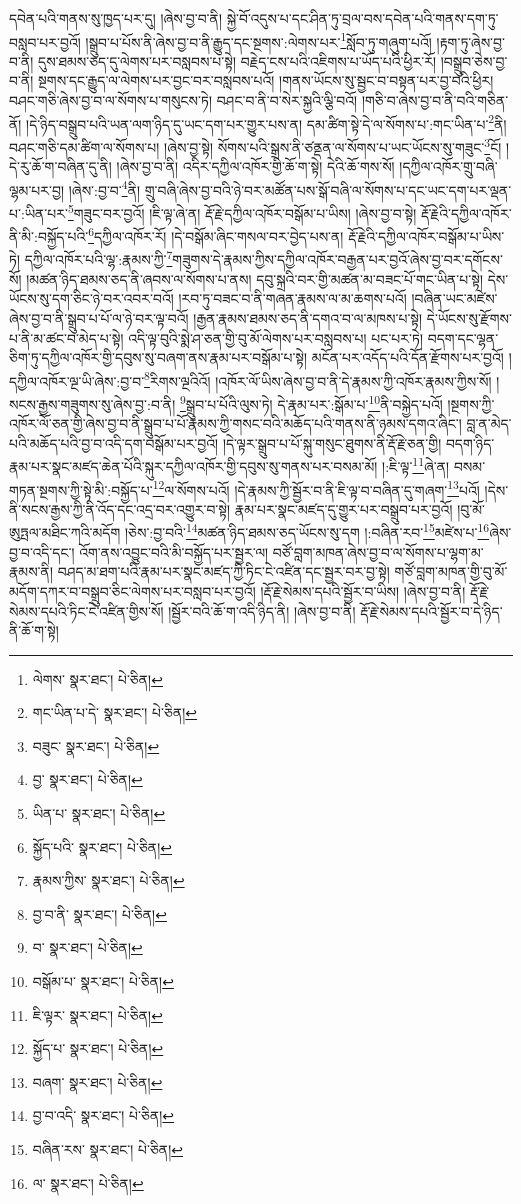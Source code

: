དབེན་པའི་གནས་སུ་ཁྱད་པར་དུ། །ཞེས་བྱ་བ་ནི། སྐྱེ་བོ་འདུས་པ་དང་ཤིན་ཏུ་བྲལ་བས་དབེན་པའི་གནས་དག་ཏུ་བསླབ་པར་བྱའོ། །སྒྲུབ་པ་པོས་ནི་ཞེས་བྱ་བ་ནི་རྒྱུད་དང་སྔགས་:ལེགས་པར་\footnote{ལེགས་  སྣར་ཐང་།  པེ་ཅིན། }སློབ་ཏུ་གཞུག་པའོ། །རྟག་ཏུ་ཞེས་བྱ་བ་ནི། དུས་ཐམས་ཅད་དུ་ལེགས་པར་བསླབས་པ་སྟེ། བརྗེད་ངས་པའི་འཇིགས་པ་ཡོད་པའི་ཕྱིར་རོ། །བསྒྲུབ་ཅེས་བྱ་བ་ནི། སྔགས་དང་རྒྱུད་ལ་ལེགས་པར་བྱང་བར་བསླབས་པའོ། །གནས་ཡོངས་སུ་སྦྱང་བ་བསྟན་པར་བྱ་བའི་ཕྱིར། བཤང་གཅི་ཞེས་བྱ་བ་ལ་སོགས་པ་གསུངས་ཏེ། བཤང་བ་ནི་བ་སེར་སྐྱའི་ལྕི་བའོ། །གཅི་བ་ཞེས་བྱ་བ་ནི་བའི་གཅིན་ནོ། །དེ་ཉིད་བསྒྲུབ་པའི་ཡན་ལག་ཉིད་དུ་ཡང་དག་པར་གྱུར་པས་ན། དམ་ཚིག་སྟེ་དེ་ལ་སོགས་པ་:གང་ཡིན་པ་\footnote{གང་ཡིན་པ་དེ་  སྣར་ཐང་།  པེ་ཅིན། }ནི། བཤང་གཅི་དམ་ཚིག་ལ་སོགས་པ། །ཞེས་བྱ་སྟེ། སོགས་པའི་སྒྲས་ནི་ཙནྡན་ལ་སོགས་པ་ཡང་ཡོངས་སུ་གཟུང་\footnote{བཟུང་  སྣར་ཐང་།  པེ་ཅིན། }ངོ། །དེ་རུ་ཆོ་ག་བཞིན་དུ་ནི། །ཞེས་བྱ་བ་ནི། འདིར་དཀྱིལ་འཁོར་གྱི་ཆོ་ག་སྟེ། དེའི་ཆོ་གས་སོ། །དཀྱིལ་འཁོར་གྲུ་བཞི་ལྷམ་པར་བྱ། །ཞེས་:བྱ་བ་\footnote{བྱ་  སྣར་ཐང་།  པེ་ཅིན། }ནི། གྲུ་བཞི་ཞེས་བྱ་བའི་ཉེ་བར་མཚོན་པས་སྒོ་བཞི་ལ་སོགས་པ་དང་ཡང་དག་པར་ལྡན་པ་:ཡིན་པར་\footnote{ཡིན་པ་  སྣར་ཐང་།  པེ་ཅིན། }གཟུང་བར་བྱའོ། །ཇི་ལྟ་ཞེ་ན། རྡོ་རྗེ་དཀྱིལ་འཁོར་བསྒོམ་པ་ཡིས། །ཞེས་བྱ་བ་སྟེ། རྡོ་རྗེའི་དཀྱིལ་འཁོར་ནི་མི་:བསྐྱོད་པའི་\footnote{སྐྱོད་པའི་  སྣར་ཐང་།  པེ་ཅིན། }དཀྱིལ་འཁོར་རོ། །དེ་བསྒོམ་ཞིང་གསལ་བར་བྱེད་པས་ན། རྡོ་རྗེའི་དཀྱིལ་འཁོར་བསྒོམ་པ་ཡིས་ཏེ། དཀྱིལ་འཁོར་པའི་ལྷ་:རྣམས་ཀྱི་\footnote{རྣམས་ཀྱིས་  སྣར་ཐང་།  པེ་ཅིན། }གཟུགས་དེ་རྣམས་ཀྱིས་དཀྱིལ་འཁོར་བརྒྱན་པར་བྱའོ་ཞེས་བྱ་བར་དགོངས་སོ། །མཚན་ཉིད་ཐམས་ཅད་ནི་ཞབས་ལ་སོགས་པ་ནས། དབུ་སྐྲའི་བར་གྱི་མཚན་མ་བཟང་པོ་གང་ཡིན་པ་སྟེ། དེས་ཡོངས་སུ་དག་ཅིང་ཉེ་བར་འབར་བའོ། །རབ་ཏུ་བཟང་བ་ནི་གཞན་རྣམས་ལ་མ་ཆགས་པའོ། །བཞིན་ཡང་མཛེས་ཞེས་བྱ་བ་ནི་སྒྲུབ་པ་པོ་ལ་ཉེ་བར་ལྟ་བའོ། །རྒྱན་རྣམས་ཐམས་ཅད་ནི་དགའ་བ་ལ་མཁས་པ་སྟེ། དེ་ཡོངས་སུ་རྫོགས་པ་ནི་མ་ཚང་བ་མེད་པ་སྟེ། འདི་ལྟ་བུའི་སྨེ་ཤ་ཅན་གྱི་བུ་མོ་ལེགས་པར་བསླབས་པ། པང་པར་ཏེ། བདག་དང་ལྷན་ཅིག་ཏུ་དཀྱིལ་འཁོར་གྱི་དབུས་སུ་བཞག་ནས་རྣམ་པར་བསྒོམ་པ་སྟེ། མངོན་པར་འདོད་པའི་དོན་རྫོགས་པར་བྱའོ། །དཀྱིལ་འཁོར་ལྔ་ཡི་ཞེས་:བྱ་བ་\footnote{བྱ་བ་ནི་  སྣར་ཐང་།  པེ་ཅིན། }རིགས་ལྔའིའོ། །འཁོར་ལོ་ཡིས་ཞེས་བྱ་བ་ནི་དེ་རྣམས་ཀྱི་འཁོར་རྣམས་ཀྱིས་སོ། །སངས་རྒྱས་གཟུགས་སུ་ཞེས་བྱ་:བ་ནི། \footnote{བ་  སྣར་ཐང་།  པེ་ཅིན། }སྒྲུབ་པ་པོའི་ལུས་ཏེ། དེ་རྣམ་པར་:སྒོམ་པ་\footnote{བསྒོམ་པ་  སྣར་ཐང་།  པེ་ཅིན། }ནི་བསྐྱེད་པའོ། །སྔགས་ཀྱི་འཁོར་ལོ་ཅན་གྱི་ཞེས་བྱ་བ་ནི་སྒྲུབ་པ་པོ་རྣམས་ཀྱི་གསང་བའི་མཆོད་པའི་གནས་ནི་ཉམས་དགའ་ཞིང་། བླ་ན་མེད་པའི་མཆོད་པའི་བྱ་བ་འདི་དག་བསྒོམ་པར་བྱའོ། །དེ་ལྟར་སྒྲུབ་པ་པོ་སྐུ་གསུང་ཐུགས་ནི་རྡོ་རྗེ་ཅན་གྱི། བདག་ཉིད་རྣམ་པར་སྣང་མཛད་ཆེན་པོའི་སྐུར་དཀྱིལ་འཁོར་གྱི་དབུས་སུ་གནས་པར་བསམ་མོ། །:ཇི་ལྟ་\footnote{ཇི་ལྟར་  སྣར་ཐང་།  པེ་ཅིན། }ཞེ་ན། བསམ་གཏན་སྔགས་ཀྱི་སྟེ་མི་:བསྐྱོད་པ་\footnote{སྐྱོད་པ་  སྣར་ཐང་།  པེ་ཅིན། }ལ་སོགས་པའོ། །དེ་རྣམས་ཀྱི་སྦྱོར་བ་ནི་ཇི་ལྟ་བ་བཞིན་དུ་གཞག་\footnote{བཞག་  སྣར་ཐང་།  པེ་ཅིན། }པའོ། །དེས་ནི་སངས་རྒྱས་ཀྱི་ནི་འོད་དང་འདྲ་བར་འགྱུར་བ་སྟེ། རྣམ་པར་སྣང་མཛད་དུ་གྱུར་པར་བསྒྲུབ་པར་བྱའོ། །བུ་མོ་ཨུཏྤལ་མཐིང་ཀའི་མདོག །ཅེས་:བྱ་བའི་\footnote{བྱ་བ་འདི་  སྣར་ཐང་།  པེ་ཅིན། }མཚན་ཉིད་ཐམས་ཅད་ཡོངས་སུ་དག །:བཞིན་རབ་\footnote{བཞིན་རས་  སྣར་ཐང་།  པེ་ཅིན། }མཛེས་པ་\footnote{ལ་  སྣར་ཐང་།  པེ་ཅིན། }ཞེས་བྱ་བ་འདི་དང་། འོག་ནས་འབྱུང་བའི་མི་བསྐྱོད་པར་སྦྱར་ལ། བཙོ་བླག་མཁན་ཞེས་བྱ་བ་ལ་སོགས་པ་ལྷག་མ་རྣམས་ནི། བཤད་མ་ཐག་པའི་རྣམ་པར་སྣང་མཛད་ཀྱི་ཏིང་ངེ་འཛིན་དང་སྦྱར་བར་བྱ་སྟེ། གཙོ་བླག་མཁན་གྱི་བུ་མོ་མདོག་དཀར་བ་བསྒྲུབ་ཅིང་ལེགས་པར་བསླབ་པར་བྱའོ། །རྡོ་རྗེ་སེམས་དཔའི་སྦྱོར་བ་ཡིས། །ཞེས་བྱ་བ་ནི། རྡོ་རྗེ་སེམས་དཔའི་ཏིང་ངེ་འཛིན་གྱིས་སོ། །སྦྱོར་བའི་ཆོ་ག་འདི་ཉིད་ནི། །ཞེས་བྱ་བ་ནི། རྡོ་རྗེ་སེམས་དཔའི་སྦྱོར་བ་དེ་ཉིད་ནི་ཆོ་ག་སྟེ། 